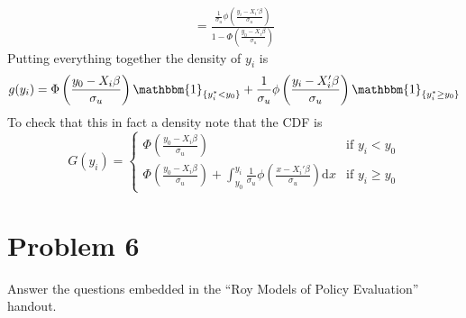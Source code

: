 \documentclass{article}
\begin{document}
\begin{solution}
\begin{align*}
     = \frac{\frac{1}{\sigma_u}\phi\left(\frac{y_i-X_i'\beta}{\sigma_u}\right)}{1-\Phi\left(\frac{y_0-X_i\beta}{\sigma_u}\right)}
\end{align*}
Putting everything together the density of $y_i$ is 
\begin{equation}
    g(y_i) = \Phi\left(\frac{y_0-X_i\beta}{\sigma_u}\right)\mathbbm{1}_{\{y_i^*<y_0\}} + \frac{1}{\sigma_u}\phi\left(\frac{y_i-X_i'\beta}{\sigma_u}\right)\mathbbm{1}_{\{y_i^*\geq y_0\}}
\end{equation}
To check that this in fact a density note that the CDF is 
\begin{equation*}
    G(y_i) = \begin{cases}
    \Phi\left(\frac{y_0-X_i\beta}{\sigma_u}\right) &\mbox{if } y_i<y_0 \\ 
    \Phi\left(\frac{y_0-X_i\beta}{\sigma_u}\right)  +\int_{y_0}^{y_i}\frac{1}{\sigma_u}\phi\left(\frac{x-X_i'\beta}{\sigma_u}\right) \mathrm{d}x &\mbox{if } y_i\geq y_0
    \end{cases}
\end{equation*}
\end{solution}

\newpage

\section*{Problem 6}
Answer the questions embedded in the ``Roy Models of Policy Evaluation'' handout.
\end{document}
